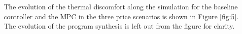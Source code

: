 The evolution of the thermal discomfort along the simulation for the baseline controller and the MPC in the three price scenarios is shown in Figure \ref{fig:5}. The evolution of the program synthesis is left out from the figure for clarity.
\begin{comment}
\begin{figure}
\texttt{[image: boptest/Fig5.eps]}
\caption{Thermal discomfort for the baseline and the three MPC scenarios in the typical heat day simulation.}
\label{fig:5}       %
\end{figure}
%

Figure \ref{fig:6} represents the evolution of the energy cost for the same simulations.

\begin{figure}
  \texttt{[image: boptest/Fig6.eps]}
\caption{Evolution of the energy cost for the baseline and MPC with different electricity price schemes for a typical heat day week.}
\label{fig:6}       %
\end{figure}
%


\subsection{Typical heat day period simulations}
\label{'results_typical'}
The second week from the typical heat day period was simulated for the baseline, the MPC and the program synthesis. Both the MPC and program synthesis were run for the three electricity price scenarios. As the baseline controller's logic is independent from the pricing scheme, its performance is not influences by the prices, and thus just a simulation of the baseline controller is considered for each period. Table \ref{tab:3} depicts the KPI corresponding to each simulation.

\begin{table}
    \caption{Overview of KPI of each controller in the typical heat day period.}
    \label{tab:3}
    

\end{comment}
